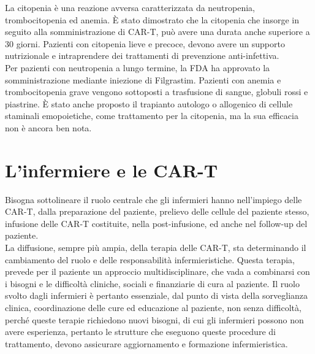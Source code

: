 La citopenia è una reazione avversa caratterizzata da neutropenia, trombocitopenia ed anemia. 
È stato dimostrato che la citopenia che insorge in seguito alla somministrazione di CAR-T, può avere una durata anche 
superiore a 30 giorni\cite{Frontiers}.
Pazienti con citopenia lieve e precoce, devono avere un supporto nutrizionale e intraprendere dei trattamenti di 
prevenzione anti-infettiva.\\ 
Per pazienti con neutropenia a lungo termine, la FDA ha approvato la somministrazione mediante iniezione di Filgrastim. 
Pazienti con anemia e trombocitopenia grave vengono sottoposti a trasfusione di sangue, globuli rossi e piastrine. 
È stato anche proposto il trapianto autologo o allogenico di cellule staminali emopoietiche, come trattamento per 
la citopenia, ma la sua efficacia non è ancora ben nota\cite{Frontiers}.

\section{L’infermiere e le CAR-T}

Bisogna sottolineare il ruolo centrale che gli infermieri hanno nell’impiego delle CAR-T, dalla preparazione del 
paziente, prelievo delle cellule del paziente stesso, infusione delle CAR-T costituite, nella post-infusione, 
ed anche nel follow-up del paziente\cite{NURSINGCART}.\\
La diffusione, sempre più ampia, della terapia delle CAR-T, sta determinando il cambiamento del ruolo e delle 
responsabilità infermieristiche. Questa terapia, prevede per il paziente un approccio multidisciplinare, che vada a 
combinarsi con i bisogni e le difficoltà cliniche, sociali e finanziarie di cura al paziente. Il ruolo svolto dagli 
infermieri è pertanto essenziale, dal punto di vista della sorveglianza clinica, coordinazione delle cure ed 
educazione al paziente, non senza difficoltà, perché queste terapie richiedono nuovi bisogni, di cui gli infermieri 
possono non avere esperienza, pertanto le strutture che eseguono queste procedure di trattamento, 
devono assicurare aggiornamento e formazione infermieristica\cite{article2}.\\

